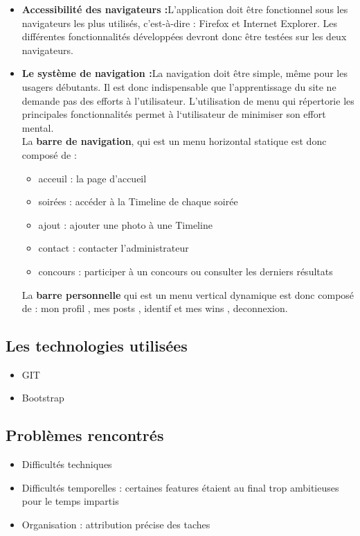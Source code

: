 \documentclass[11pt]{article} %
\begin{document}
\begin{itemize}
\item \textbf {Accessibilité des navigateurs :}L'application doit être fonctionnel sous les navigateurs les plus utilisés, c’est-à-dire : Firefox et Internet Explorer. Les différentes fonctionnalités développées devront donc être testées sur les deux navigateurs.

\item \textbf{Le système de navigation :}La navigation doit être simple, même pour les usagers débutants. Il est donc indispensable que l’apprentissage du site ne demande pas des efforts à l’utilisateur. L’utilisation de menu qui répertorie les principales fonctionnalités permet à l‘utilisateur de minimiser son effort mental.\\
La \textbf{barre de navigation}, qui est un menu horizontal statique est donc composé de :
	\begin{itemize}
	\item acceuil : la page d’accueil
	\item soirées : accéder à la Timeline de chaque soirée
	\item ajout : ajouter une photo à une Timeline
	\item contact : contacter l’administrateur
	\item concours : participer à un concours ou consulter les derniers résultats
	\end{itemize}
La \textbf{barre personnelle} qui est un menu vertical dynamique est donc composé de : mon profil , mes posts , identif et mes wins , deconnexion.
\end{itemize}


\subsection {Les technologies utilisées}
\begin{itemize}
\item GIT
\item Bootstrap
\end{itemize}
	
\subsection {Problèmes rencontrés}
\begin{itemize}
\item Difficultés techniques
\item Difficultés temporelles : certaines features étaient au final trop ambitieuses pour le temps impartis
\item Organisation : attribution précise des taches
\end{itemize}
\end{document}
